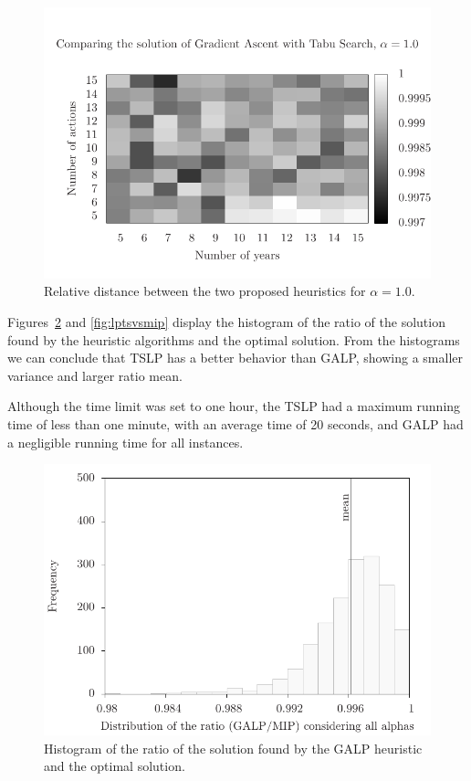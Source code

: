 \begin{figure}
\centering
\includegraphics[scale=0.5, trim=0.75cm 0cm 0 2cm, clip=true]{imgs/comp_easy_sg_ts.pdf}
\caption{Relative distance between the two proposed heuristics for $\alpha=1.0$.}
\label{fig:comp_3}
\end{figure}

Figures~\ref{fig:lpgavsmip} and \ref{fig:lptsvsmip} display the histogram of
the ratio of the solution found by the heuristic algorithms and the optimal solution.
From the histograms we can conclude that TSLP has a better behavior than GALP,
showing a smaller variance and larger ratio mean.

Although the time limit was set to one hour, the TSLP had a maximum running time of less than one minute, with an average time of 20 seconds, and GALP had a negligible running time for all instances.

\begin{figure}
\centering
\includegraphics[scale=0.7, trim=1cm 0 0 0]{imgs/lpgavsmip.pdf}
\caption{Histogram of the ratio of the solution found by the GALP heuristic and the optimal solution.}
\label{fig:lpgavsmip}
\end{figure}

